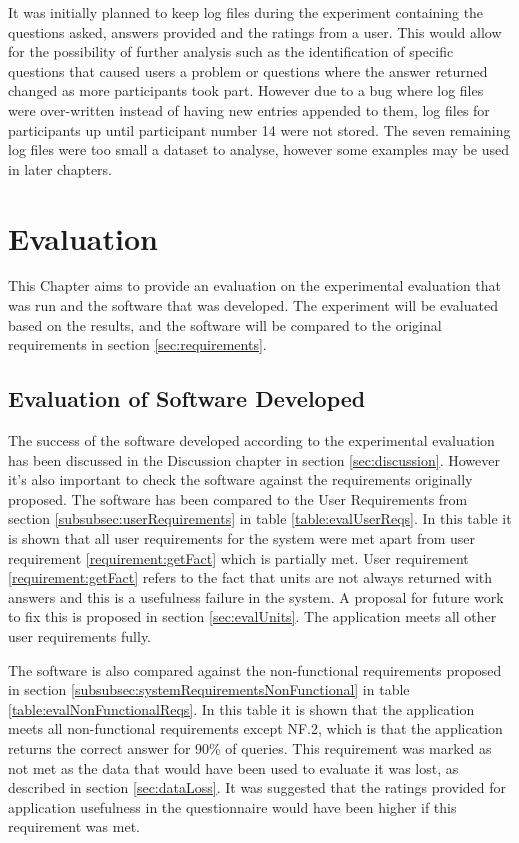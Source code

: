\documentclass[authoryearcitations]{UoYCSproject}
\begin{document}
It was initially planned to keep log files during the experiment containing the questions asked, answers provided and the ratings from a user. This would allow for the possibility of further analysis such as the identification of specific questions that caused users a problem or questions where the answer returned changed as more participants took part. However due to a bug where log files were over-written instead of having new entries appended to them, log files for participants up until participant number 14 were not stored. The seven remaining log files were too small a dataset to analyse, however some examples may be used in later chapters.

\newpage

\newpage
\chapter{Evaluation}
\label{sec:evaluation}

This Chapter aims to provide an evaluation on the experimental evaluation that was run and the software that was developed. The experiment will be evaluated based on the results, and the software will be compared to the original requirements in section \ref{sec:requirements}.

\section{Evaluation of Software Developed}
\label{sec:evalSoftwareDeveloped}

The success of the software developed according to the experimental evaluation has been discussed in the Discussion chapter in section \ref{sec:discussion}. However it's also important to check the software against the requirements originally proposed. The software has been compared to the User Requirements from section \ref{subsubsec:userRequirements} in table \ref{table:evalUserReqs}. In this table it is shown that all user requirements for the system were met apart from user requirement \ref{requirement:getFact} which is partially met. User requirement \ref{requirement:getFact} refers to the fact that units are not always returned with answers and this is a usefulness failure in the system. A proposal for future work to fix this is proposed in section \ref{sec:evalUnits}. The application meets all other user requirements fully.

The software is also compared against the non-functional requirements proposed in section \ref{subsubsec:systemRequirementsNonFunctional} in table \ref{table:evalNonFunctionalReqs}. In this table it is shown that the application meets all non-functional requirements except NF.2, which is that the application returns the correct answer for 90\% of queries. This requirement was marked as not met as the data that would have been used to evaluate it was lost, as described in section \ref{sec:dataLoss}. It was suggested that the ratings provided for application usefulness in the questionnaire would have been higher if this requirement was met.
\end{document}
